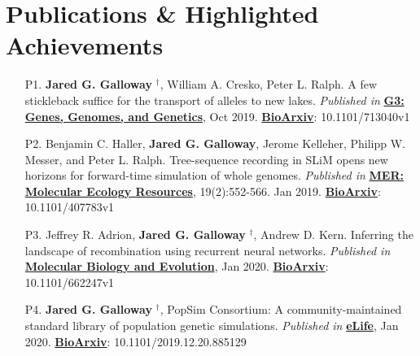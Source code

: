 \documentclass[letterpaper,11pt]{article}
\let\oldhref\href
\renewcommand{\href}[2]{\oldhref{#1}{\bfseries#2}}
\begin{document}
\section{Publications \& Highlighted Achievements}
%

\begin{enumerate}
\item [P1.] \textbf{Jared G. Galloway} $^{\dagger}$, William A. Cresko, Peter L. Ralph. A few stickleback suffice for the transport
of alleles to new lakes. 
\textit{Published in} 
\href{https://www.g3journal.org/content/early/2019/12/04/g3.119.400564}{G3: Genes, Genomes, and Genetics}, Oct 2019.
\href{https://www.biorxiv.org/content/10.1101/713040v1.abstract}{BioArxiv}: 10.1101/713040v1

\item [P2.] Benjamin C. Haller, \textbf{Jared G. Galloway}, Jerome Kelleher, Philipp W. Messer, and Peter L. Ralph.
Tree-sequence recording in SLiM opens new horizons for forward-time simulation of whole genomes. 
\textit{Published in} 
\href{https://onlinelibrary.wiley.com/doi/abs/10.1111/1755-0998.12968}{MER: Molecular Ecology Resources}, 19(2):552-566. Jan 2019. 
\href{https://www.biorxiv.org/content/10.1101/407783v1}{BioArxiv}: 10.1101/407783v1 

\item [P3.] Jeffrey R. Adrion, \textbf{Jared G. Galloway} $^{\dagger}$, Andrew D. Kern. Inferring the landscape of recombination 
using recurrent neural networks. 
\textit{Published in} 
\href{https://academic.oup.com/mbe}{Molecular Biology and Evolution}, Jan 2020.
\href{https://www.biorxiv.org/content/10.1101/662247v1.abstract}{BioArxiv}: 10.1101/662247v1

\item [P4.] \textbf{Jared G. Galloway} $^{\dagger}$, PopSim Consortium:
A community-maintained standard library of population genetic simulations.
\textit{Published in}
\href{https://elifesciences.org/?gclid=CjwKCAiA6vXwBRBKEiwAYE7iS0LA_KboY5NjoOVJAMq06BEUSsqPFV9R1GA1NUUIgYw2XgTiv1fUxhoC3xYQAvD_BwE}{eLife}, Jan 2020.
\href{https://www.biorxiv.org/content/10.1101/2019.12.20.885129v1}{BioArxiv}: 10.1101/2019.12.20.885129 



\end{enumerate}
\end{document}
